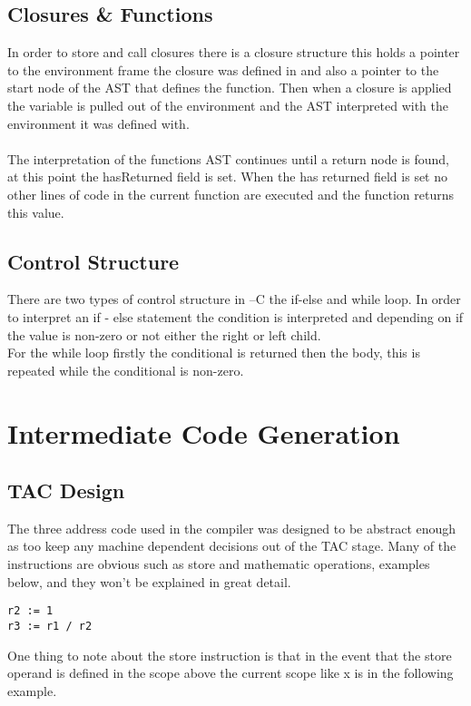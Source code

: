 \documentclass{article}
\begin{document}
\subsection{Closures \& Functions}
In order to store and call closures there is a closure structure this holds a pointer
to the environment frame the closure was defined in and also a pointer to the start node
of the AST that defines the function. Then when a closure is applied the variable is pulled
out of the environment and the AST interpreted with the environment it was defined with.\\~\\
The interpretation of the functions AST continues until a return node is found, at
this point the hasReturned field is set. When the has returned field is set
no other lines of code in the current function are executed and the function returns this
value.

\subsection{Control Structure}
There are two types of control structure in --C the if-else and while loop.
In order to interpret an if - else statement the condition is interpreted and depending on
if the value is non-zero or not either the right or left child.\\
For the while loop firstly the conditional is returned then the body, this is repeated
while the conditional is non-zero.



\section{Intermediate Code Generation}

\subsection{TAC Design}

The three address code used in the compiler was designed to be abstract enough as
too keep any machine dependent decisions out of the TAC stage. Many of the instructions
are obvious such as store and mathematic operations, examples below, and they won't be explained in
great detail.

\begin{lstlisting}
r2 := 1
r3 := r1 / r2
\end{lstlisting}

One thing to note about the store instruction is that in the event that the store
operand is defined in the scope above the current scope like x is in the following example.
\end{document}
